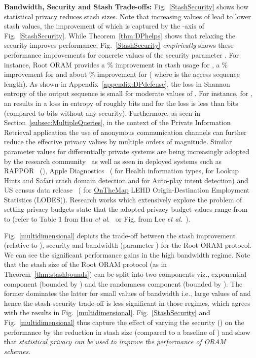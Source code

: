 \documentclass[USenglish,oneside,twocolumn]{article}
\newcommand{\ourprotocol}{Root ORAM}
\newcommand{\etal}{\textit{et al}.}
\begin{document}
\textbf{Bandwidth, Security and Stash Trade-offs: }Fig.~\ref{StashSecurity} shows how statistical privacy reduces stash sizes. Note that increasing values of  lead to lower stash values, the improvement of which is captured by the -axis of Fig.~\ref{StashSecurity}. While Theorem~\ref{thm:DPhelps} shows that relaxing the security improves performance, Fig.~\ref{StashSecurity} \textit{empirically} shows these performance improvements for concrete values of the security parameter . 
For instance, \ourprotocol{} provides a \% improvement in stash usage for , a \% improvement for  and about \% improvement for  ( where  is the access sequence length). 
As shown in Appendix~\ref{appendix:DPdefense}, the loss in Shannon entropy of the output sequence is small for moderate values of . For instance, for , an  results in a loss in entropy of roughly  bits and for  the loss is less than  bits (compared to  bits without any security).
Furthermore, as seen in Section~\ref{subsec:MultipleQueries}, in the context of the Private Information Retrieval application the use of anonymous communication channels can further reduce the effective privacy values  by multiple orders of magnitude.
Similar parameter values for differentially private systems are being increasingly adopted by the research community~\cite{goldbergDPPIR} as well as seen in deployed systems such as RAPPOR~\cite{rappor} (), Apple Diagnostics~\cite{appleDP, appleDPepsilon} ( for Health information types,  for Lookup Hints and Safari crash domain detection and  for Auto-play intent detection) and US census data release~\cite{UScensusJohn, UScensusDP, UScensusDPharvard} ( for \href{http://onthemap.ces.census.gov/}{OnTheMap} LEHD Origin-Destination Employment Statistics (LODES)). Research works which extensively explore the problem of setting privacy budgets state that the adopted privacy budget values range from  to  (refer to Table 1 from Hsu \etal~\cite{hsu2014differential} or Fig.  from Lee \etal~\cite{lee2011much}).



Fig.~\ref{multidimensional} depicts the trade-off between the stash improvement (relative to ), security and bandwidth (parameter ) for the \ourprotocol{} protocol. We can see the significant performance gains in the high bandwidth regime. Note that the stash size of the \ourprotocol{} protocol (as in Theorem~\ref{thm:stashbounds}) can be split into two components viz., exponential component (bounded by ) and the randomness component (bounded by ). The former dominates the latter for small values of bandwidth i.e., large values of  and hence the stash-security trade-off is less significant in those regimes, which agrees with the results in Fig.~\ref{multidimensional}. Fig.~\ref{StashSecurity} and Fig.~\ref{multidimensional} thus capture the effect of varying the security () on the performance by the reduction in stash size (compared to a baseline of ) and show that \textit{statistical privacy can be used to improve the performance of ORAM schemes.}
\end{document}
